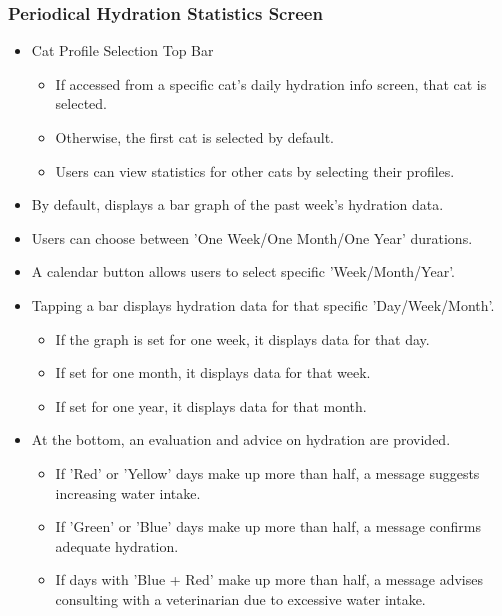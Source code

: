 \documentclass[conference]{IEEEtran}
\begin{document}
\subsubsection{Periodical Hydration Statistics Screen}
\begin{itemize}
    \item Cat Profile Selection Top Bar
    \begin{itemize}
        \item If accessed from a specific cat's daily hydration info screen, that cat is selected.
        \item Otherwise, the first cat is selected by default.
        \item Users can view statistics for other cats by selecting their profiles.
    \end{itemize}
    \item By default, displays a bar graph of the past week's hydration data.
    \item Users can choose between 'One Week/One Month/One Year' durations.
    \item A calendar button allows users to select specific 'Week/Month/Year'.
    \item Tapping a bar displays hydration data for that specific 'Day/Week/Month'.
    \begin{itemize}
        \item If the graph is set for one week, it displays data for that day.
        \item If set for one month, it displays data for that week.
        \item If set for one year, it displays data for that month.
    \end{itemize}
    \item At the bottom, an evaluation and advice on hydration are provided.
    \begin{itemize}
        \item If 'Red' or 'Yellow' days make up more than half, a message suggests increasing water intake.
        \item If 'Green' or 'Blue' days make up more than half, a message confirms adequate hydration.
        \item If days with 'Blue + Red' make up more than half, a message advises consulting with a veterinarian due to excessive water intake.\\
    \end{itemize}
\end{itemize}
\end{document}
